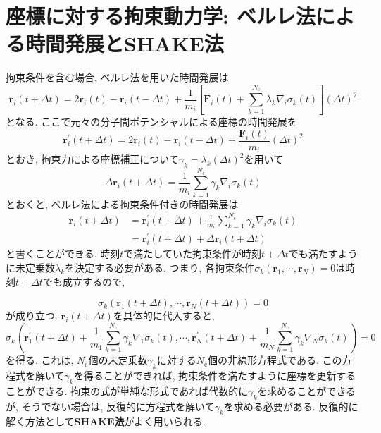\section{座標に対する拘束動力学: ベルレ法による時間発展とSHAKE法}
拘束条件を含む場合, ベルレ法を用いた時間発展は
\begin{equation}
    \bm{r}_{i} (t + \Delta t) = 2 \bm{r}_{i} (t) - \bm{r}_{i} (t - \Delta t) + \frac{1}{m_{i}}\left[ \bm{F}_{i}(t) + \sum_{k=1}^{N_{\mathrm{c}}} \lambda_{k} \nabla_{i} \sigma_{k}(t) \right] (\Delta t)^{2}
\end{equation}
となる. 
ここで元々の分子間ポテンシャルによる座標の時間発展を
\begin{equation}
    \bm{r}_{i}^{\prime} (t + \Delta t) = 2 \bm{r}_{i} (t) - \bm{r}_{i} (t - \Delta t) +  \frac{\bm{F}_{i}(t)}{m_{i}}  (\Delta t)^{2}
\end{equation}
とおき, 拘束力による座標補正について$\gamma_{k} = \lambda_{k}(\Delta t)^{2}$を用いて
\begin{equation}
    \Delta \bm{r}_{i}(t + \Delta t) = \frac{1}{m_{i}} \sum_{k=1}^{N_{\mathrm{c}}} \gamma_{k} \nabla_{i} \sigma_{k}(t)
\end{equation}
とおくと, ベルレ法による拘束条件付きの時間発展は
\begin{align}
    \bm{r}_{i} (t + \Delta t)
    &= \bm{r}_{i}^{\prime} (t + \Delta t) + \frac{1}{m_{i}} \sum_{k=1}^{N_{\mathrm{c}}} \gamma_{k} \nabla_{i} \sigma_{k}(t)
    \\
    &= \bm{r}_{i}^{\prime} (t + \Delta t) + \Delta \bm{r}_{i}(t + \Delta t)
\end{align}
と書くことができる. 
時刻$t$で満たしていた拘束条件が時刻$t + \Delta t$でも満たすように未定乗数$\lambda_{k}$を決定する必要がある. 
つまり, 各拘束条件$\sigma_{k} (\bm{r}_{1}, \cdots, \bm{r}_{N})=0$は時刻$t + \Delta t$でも成立するので, 

\begin{equation}
    \sigma_{k} (\bm{r}_{1}(t + \Delta t), \cdots, \bm{r}_{N}(t + \Delta t)) = 0
\end{equation}
が成り立つ. $\bm{r}_{i} (t + \Delta t)$を具体的に代入すると, 
\begin{equation}
    \sigma_{k} \left( \bm{r}_{1}^{\prime} (t + \Delta t) + \frac{1}{m_{1}} \sum_{k=1}^{N_{\mathrm{c}}} \gamma_{k} \nabla_{1} \sigma_{k}(t), \cdots, \bm{r}_{N}^{\prime} (t + \Delta t) + \frac{1}{m_{N}} \sum_{k=1}^{N_{\mathrm{c}}} \gamma_{k} \nabla_{N} \sigma_{k}(t) \right) = 0
\end{equation}
を得る. 
これは, $N_{\mathrm{c}}$個の未定乗数$\gamma_{k}$に対する$N_{\mathrm{c}}$個の非線形方程式である. 
この方程式を解いて$\gamma_{k}$を得ることができれば, 拘束条件を満たすように座標を更新することができる. 
拘束の式が単純な形式であれば代数的に$\gamma_{k}$を求めることができるが, そうでない場合は, 反復的に方程式を解いて$\gamma_{k}$を求める必要がある. 
反復的に解く方法として\textbf{SHAKE法}\cite{1977Ryckaert}がよく用いられる. 


